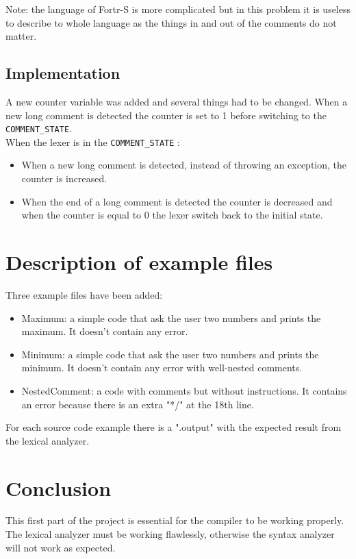\documentclass{article}
\begin{document}
Note: the language of Fortr-S is more complicated but in this problem it is useless to describe to whole language as the things in and out of the comments do not matter.

\subsection{Implementation}
A new counter variable was added and several things had to be changed.
When a new long comment is detected the counter is set to 1 before switching to the \texttt{COMMENT\_STATE}.\\

When the lexer is in the \texttt{COMMENT\_STATE} :
\begin{itemize}
\item When a new long comment is detected, instead of throwing an exception, the counter is increased.\\
\item When the end of a long comment is detected the counter is decreased and when the counter is equal to $0$ the lexer switch back to the initial state.
\end{itemize}

\section{Description of example files}
Three example files have been added:
\begin{itemize}
\item Maximum: a simple code that ask the user two numbers and prints the maximum. It doesn't contain any error.
\item Minimum: a simple code that ask the user two numbers and prints the minimum. It doesn't contain any error with well-nested comments.
\item NestedComment: a code with comments but without instructions. It contains an error because there is an extra "*/" at the 18th line.
\end{itemize}

For each source code example there is a ".output" with the expected result from the lexical analyzer.

\section{Conclusion}
This first part of the project is essential for the compiler to be working properly. The lexical analyzer must be working flawlessly, otherwise the syntax analyzer will not work as expected.
\end{document}
